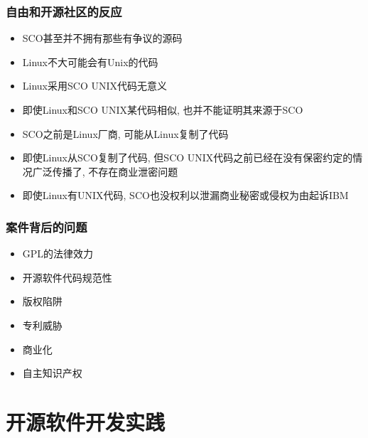 \documentclass[compress]{beamer}
\begin{document}
\begin{frame}
\frametitle{自由和开源社区的反应}
\begin{itemize}
\item SCO甚至并不拥有那些有争议的源码
\item Linux不大可能会有Unix的代码
\item Linux采用SCO UNIX代码无意义
\item 即使Linux和SCO UNIX某代码相似, 也并不能证明其来源于SCO
\item SCO之前是Linux厂商, 可能从Linux复制了代码
\item 即使Linux从SCO复制了代码, 但SCO UNIX代码之前已经在没有保密约定的情况广泛传播了, 不存在商业泄密问题
\item 即使Linux有UNIX代码, SCO也没权利以泄漏商业秘密或侵权为由起诉IBM
\end{itemize}
\end{frame}

\begin{frame}
\frametitle{案件背后的问题}
\begin{itemize}
\item GPL的法律效力
\item 开源软件代码规范性
\item 版权陷阱
\item 专利威胁
\item 商业化
\item 自主知识产权
\end{itemize}

\end{frame}


\section{开源软件开发实践}
\end{document}
